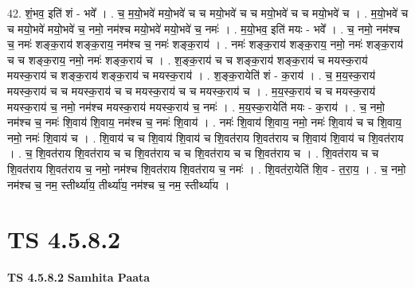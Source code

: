 \documentclass[17pt]{extarticle}
\begin{document}
42. शं॒भव॒ इति॑ शं - भवे᳚ । . च॒ म॒यो॒भवे॑ मयो॒भवे॑ च च मयो॒भवे॑ च च मयो॒भवे॑ च च मयो॒भवे॑ च । . म॒यो॒भवे॑ च च मयो॒भवे॑ मयो॒भवे॑ च॒ नमो॒ नम॑श्च मयो॒भवे॑ मयो॒भवे॑ च॒ नमः॑ । . म॒यो॒भव॒ इति॑ मयः - भवे᳚ । . च॒ नमो॒ नम॑श्च च॒ नमः॑ शङ्क॒राय॑ शङ्क॒राय॒ नम॑श्च च॒ नमः॑ शङ्क॒राय॑ । . नमः॑ शङ्क॒राय॑ शङ्क॒राय॒ नमो॒ नमः॑ शङ्क॒राय॑ च च शङ्क॒राय॒ नमो॒ नमः॑ शङ्क॒राय॑ च । . श॒ङ्क॒राय॑ च च शङ्क॒राय॑ शङ्क॒राय॑ च मयस्क॒राय॑ मयस्क॒राय॑ च शङ्क॒राय॑ शङ्क॒राय॑ च मयस्क॒राय॑ । . श॒ङ्क॒रायेति॑ शं - क॒राय॑ । . च॒ म॒य॒स्क॒राय॑ मयस्क॒राय॑ च च मयस्क॒राय॑ च च मयस्क॒राय॑ च च मयस्क॒राय॑ च । . म॒य॒स्क॒राय॑ च च मयस्क॒राय॑ मयस्क॒राय॑ च॒ नमो॒ नम॑श्च मयस्क॒राय॑ मयस्क॒राय॑ च॒ नमः॑ । . म॒य॒स्क॒रायेति॑ मयः - क॒राय॑ । . च॒ नमो॒ नम॑श्च च॒ नमः॑ शि॒वाय॑ शि॒वाय॒ नम॑श्च च॒ नमः॑ शि॒वाय॑ । . नमः॑ शि॒वाय॑ शि॒वाय॒ नमो॒ नमः॑ शि॒वाय॑ च च शि॒वाय॒ नमो॒ नमः॑ शि॒वाय॑ च । . शि॒वाय॑ च च शि॒वाय॑ शि॒वाय॑ च शि॒वत॑राय शि॒वत॑राय च शि॒वाय॑ शि॒वाय॑ च शि॒वत॑राय । . च॒ शि॒वत॑राय शि॒वत॑राय च च शि॒वत॑राय च च शि॒वत॑राय च च शि॒वत॑राय च । . शि॒वत॑राय च च शि॒वत॑राय शि॒वत॑राय च॒ नमो॒ नम॑श्च शि॒वत॑राय शि॒वत॑राय च॒ नमः॑ । . शि॒वत॑रा॒येति॑ शि॒व - त॒रा॒य॒ । . च॒ नमो॒ नम॑श्च च॒ नम॒ स्तीर्थ्या॑य॒ तीर्थ्या॑य॒ नम॑श्च च॒ नम॒ स्तीर्थ्या॑य । \newline
\pagebreak
{}

\section{ TS 4.5.8.2 }

\textbf{TS 4.5.8.2 } \newline
\textbf{Samhita Paata} \newline
\end{document}
